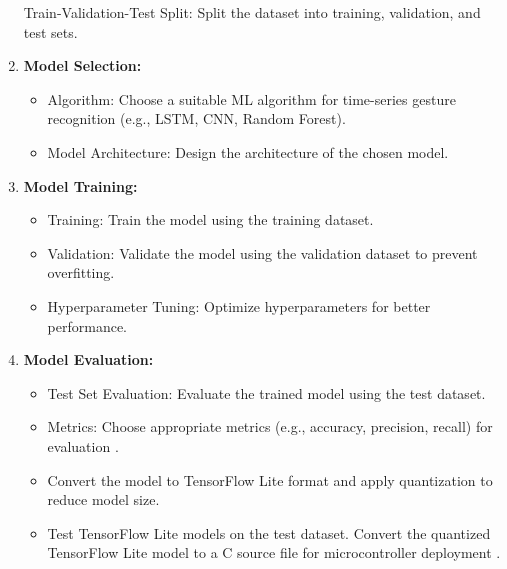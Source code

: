 \begin{enumerate}
	Train-Validation-Test Split: Split the dataset into training, validation, and test sets.
	
	\item \textbf{Model Selection:}
	
	\begin{itemize}
		
		\item Algorithm: Choose a suitable ML algorithm for time-series gesture recognition (e.g., LSTM, CNN, Random Forest).
		
		\item Model Architecture: Design the architecture of the chosen model.
		
	\end{itemize}
	
	\item \textbf{Model Training:}
	
	\begin{itemize}
		
		\item Training: Train the model using the training dataset.
		
		\item Validation: Validate the model using the validation dataset to prevent overfitting.
		
		\item Hyperparameter Tuning: Optimize hyperparameters for better performance.
		
	\end{itemize}
	
	\item \textbf{Model Evaluation:}
	
	\begin{itemize}
		
		\item Test Set Evaluation: Evaluate the trained model using the test dataset.
		
		\item Metrics: Choose appropriate metrics (e.g., accuracy, precision, recall) for evaluation \cite{Zhou:2020}.
		
		\item Convert the model to TensorFlow Lite format and apply quantization to reduce model size.
		
		\item Test TensorFlow Lite models on the test dataset. Convert the quantized TensorFlow Lite model to a C source file for microcontroller deployment \cite{TensorFlow:2023}.
		

\end{itemize}
\end{enumerate}
